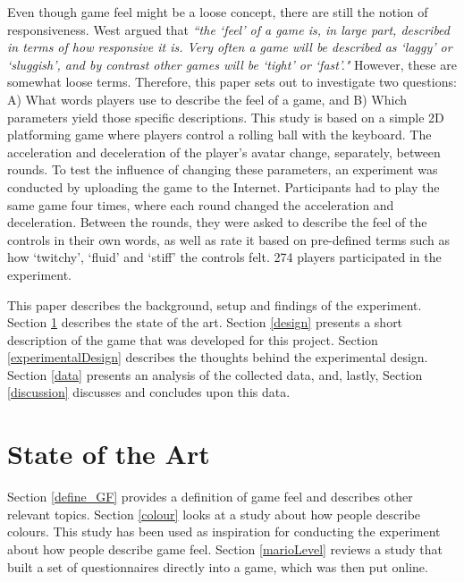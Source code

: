 Even though game feel might be a loose concept, there are still the notion of responsiveness. West argued that \textit{``the `feel' of a game is, in large part, described in terms of how responsive it is. Very often a game will be described as `laggy' or `sluggish', and by contrast other games will be `tight' or `fast'."} \cite{measure_lag} However, these are somewhat loose terms. Therefore, this paper sets out to investigate two questions: A) What words players use to describe the feel of a game, and B) Which parameters yield those specific descriptions. This study is based on a simple 2D platforming game where players control a rolling ball with the keyboard. The acceleration and deceleration of the player's avatar change, separately, between rounds. To test the influence of changing these parameters, an experiment was conducted by uploading the game to the Internet. Participants had to play the same game four times, where each round changed the acceleration and deceleration. Between the rounds, they were asked to describe the feel of the controls in their own words, as well as rate it based on pre-defined terms such as how `twitchy', `fluid' and `stiff' the controls felt. 274 players participated in the experiment.


This paper describes the background, setup and findings of the experiment. Section \ref{stateOfTheArt} describes the state of the art. Section \ref{design} presents a short description of the game that was developed for this project. Section \ref{experimentalDesign} describes the thoughts behind the experimental design. Section \ref{data} presents an analysis of the collected data, and, lastly, Section \ref{discussion} discusses and concludes upon this data.

\section{State of the Art} \label{stateOfTheArt}
Section \ref{define_GF} provides a definition of game feel and describes other relevant topics. Section \ref{colour} looks at a study about how people describe colours. This study has been used as inspiration for conducting the experiment about how people describe game feel. Section \ref{marioLevel} reviews a study that built a set of questionnaires directly into a game, which was then put online.

